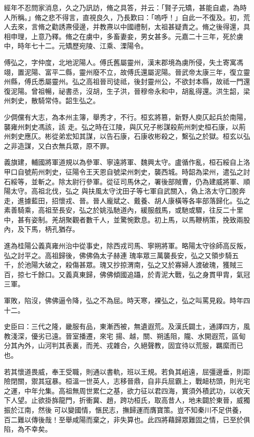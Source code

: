 \begin{pinyinscope}
 經年不忍問家消息，久之乃訊訪，脩之具答，并云：「賢子元矯，甚能自處，為時人所稱。」脩之悲不得言，直視良久，乃長歎曰：「嗚呼！」自此一不復及。初，荒人去來，言脩之勸誘燾侵邊，并教燾以中國禮制，太祖甚疑責之。脩之後得還，具相申理，上意乃釋。脩之在虜中，多畜妻妾，男女甚多。元嘉二十三年，死於虜中，時年七十二。元矯歷宛陵、江乘、溧陽令。



 傅弘之，字仲度，北地泥陽人。傅氏舊屬靈州，漢末郡境為虜所侵，失土寄寓馮翊，置泥陽、富平二縣，靈州廢不立，故傅氏還屬泥陽。晉武帝太康三年，復立靈州縣，傅氏悉屬靈州。弘之高祖晉司徒祗，後封靈州公，不欲封本縣，故祗一門還復泥陽。曾祖暢，祕書丞，沒胡，生子洪，晉穆帝永和中，胡亂得還。洪生韶，梁州刺史，散騎常侍。韶生弘之。



 少倜儻有大志，為本州主簿，舉秀才，不行。桓玄將篡，新野人庾仄起兵於南陽，襲雍州刺史馮該，該
 走。弘之時在江陵，與仄兄子彬謀殺荊州刺史桓石康，以荊州刺史應仄。彬從弟宏知其謀，以告石康，石康收彬殺之，繫弘之於獄。桓玄以弘之非造謀，又白衣無兵眾，原不罪。



 義旗建，輔國將軍道規以為參軍、寧遠將軍、魏興太守。盧循作亂，桓石綏自上洛甲口自號荊州刺史，征陽令王天恩自號梁州刺史，襲西城。時韶為梁州，遣弘之討石綏等，並斬之。除太尉行參軍。從征司馬休之，署後部賊曹，仍為建威將軍、順陽太守。高祖北伐，弘之
 與扶風太守沈田子等七軍自武關入，偽上洛太守囗脫奔走，進據藍田，招懷戎、晉。晉人龐斌之、戴養、胡人康橫等各率部落歸化。弘之素善騎乘，高祖至長安，弘之於姚泓馳道內，緩服戲馬，或馳或驟，往反二十里中，甚有姿制。羌胡聚觀者數千人，並驚惋歎息。初上馬，以馬鞭柄策，挽致兩股內，及下馬，柄孔猶存。



 進為桂陽公義真雍州治中從事史，除西戎司馬、寧朔將軍。略陽太守徐師高反叛，弘之討平之。高祖歸後，佛佛偽太子赫連
 瑰率眾三萬襲長安，弘之又領步騎五千，於池陽大破之，殺傷甚眾。瑰又抄掠渭南，弘之又於寡婦人渡破瑰，獲賊三百，掠七千餘口。又義真東歸，佛佛傾國追躡，於青泥大戰，弘之身貫甲胄，氣冠三軍。



 軍敗，陷沒，佛佛逼令降，弘之不為屈。時天寒，裸弘之，弘之叫罵見殺。時年四十二。



 史臣曰：三代之隆，畿服有品，東漸西被，無遺遐荒。及漢氏闢土，通譯四方，風教淺深，優劣已遠。晉室播遷，來宅
 揚、越，關、朔遙阻，隴、水開遐荒，區甸分其內外，山河判其表裏，而羌、戎雜合，久絕聲教，固宜待以荒服，羈縻而已也。



 若其懷道畏威，奉王受職，則通以書軌，班以王規。若負其岨遠，屈彊邊垂，則距險閉關，禦其寇暴。桓溫一世英人，志移晉鼎，自非兵屈霸上，戰衄枋頭，則光宅之運，中年允集。高祖無周世累仁之基，欲力征以君四海，實須外積武功，以收天下人望。止欲掛旆龍門，折衝冀、趙，跨功桓氏，取高昔人，地未闢於東晉，威獨振於江南，然後
 可以變國情，愜民志，撫歸運而膺寶策。豈不知秦川不足供養，百二難以傳後哉！至舉咸陽而棄之，非失算也。此四將藉歸眾難固之情，已至於俱陷，為不幸矣。






\end{pinyinscope}